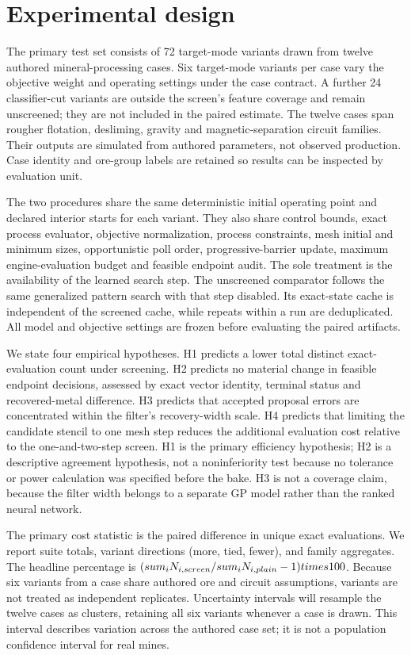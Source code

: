 \documentclass[10pt]{article}
\begin{document}
\section{Experimental design}
The primary test set consists of 72 target-mode variants drawn from twelve authored mineral-processing cases. Six target-mode variants per case vary the objective weight and operating settings under the case contract. A further 24 classifier-cut variants are outside the screen's feature coverage and remain unscreened; they are not included in the paired estimate. The twelve cases span rougher flotation, desliming, gravity and magnetic-separation circuit families. Their outputs are simulated from authored parameters, not observed production. Case identity and ore-group labels are retained so results can be inspected by evaluation unit.

The two procedures share the same deterministic initial operating point and declared interior starts for each variant. They also share control bounds, exact process evaluator, objective normalization, process constraints, mesh initial and minimum sizes, opportunistic poll order, progressive-barrier update, maximum engine-evaluation budget and feasible endpoint audit. The sole treatment is the availability of the learned search step. The unscreened comparator follows the same generalized pattern search with that step disabled. Its exact-state cache is independent of the screened cache, while repeats within a run are deduplicated. All model and objective settings are frozen before evaluating the paired artifacts.

We state four empirical hypotheses. H1 predicts a lower total distinct exact-evaluation count under screening. H2 predicts no material change in feasible endpoint decisions, assessed by exact vector identity, terminal status and recovered-metal difference. H3 predicts that accepted proposal errors are concentrated within the filter's recovery-width scale. H4 predicts that limiting the candidate stencil to one mesh step reduces the additional evaluation cost relative to the one-and-two-step screen. H1 is the primary efficiency hypothesis; H2 is a descriptive agreement hypothesis, not a noninferiority test because no tolerance or power calculation was specified before the bake. H3 is not a coverage claim, because the filter width belongs to a separate GP model rather than the ranked neural network.

The primary cost statistic is the paired difference in unique exact evaluations. We report suite totals, variant directions (more, tied, fewer), and family aggregates. The headline percentage is $(\\sum_iN_{i,screen}/\\sum_iN_{i,plain}-1)\\times100$. Because six variants from a case share authored ore and circuit assumptions, variants are not treated as independent replicates. Uncertainty intervals will resample the twelve cases as clusters, retaining all six variants whenever a case is drawn. This interval describes variation across the authored case set; it is not a population confidence interval for real mines.
\end{document}
